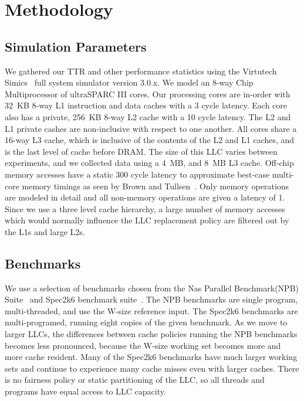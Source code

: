 \section{Methodology}

\subsection{Simulation Parameters}

We gathered our TTR and other performance statistics using the
Virtutech Simics~\cite{magnussonchristensson02} full 
system simulator version 3.0.x.  We model an 8-way Chip Multiprocessor
of ultraSPARC III cores.   Our processing cores
are in-order with 32~KB 8-way L1 instruction and data
caches with a 3 cycle latency.  Each core also has a private, 256~KB
8-way L2 cache with a 10 cycle latency.  The L2 and L1 private cashes
are non-inclusive with respect to one another.  All cores share a 16-way L3
cache, which is inclusive of the contents of the L2 and L1 caches, and
is the last level of cache before DRAM.  The size of this LLC varies
between experiments, and we collected data using a 4~MB, and 8~MB L3
cache.  Off-chip memory accesses have a static 300 cycle 
latency to approximate best-case multi-core memory timings as seen by
Brown and Tullsen~\cite{browntullsen08}.  Only memory operations are
modeled in detail and all non-memory operations are given a latency of
1.  Since we use a three level cache hierarchy, a large number of
memory accesses which would normally influence the LLC replacement policy are
filtered out by the L1s and large L2s.

\subsection{Benchmarks}

We use a selection of benchmarks chosen from the Nas Parallel
Benchmark(NPB)  Suite~\cite{NPB94} and Spec2k6 benchmark
suite~\cite{henning05}.  The NPB benchmarks are single
program, multi-threaded, and use the W-size reference input.  The Spec2k6 benchmarks are
multi-programed, running eight copies of the given benchmark.  As we
move to larger LLCs, the differences between cache policies
running  the NPB benchmarks
becomes less pronounced, because the W-size working set becomes more
and more cache resident.  Many of the Spec2k6 benchmarks have much
larger working sets and  continue to
experience many cache misses even with larger caches.  There is
no fairness policy or static partitioning of the LLC, so all threads
and programs have equal access to LLC capacity.

